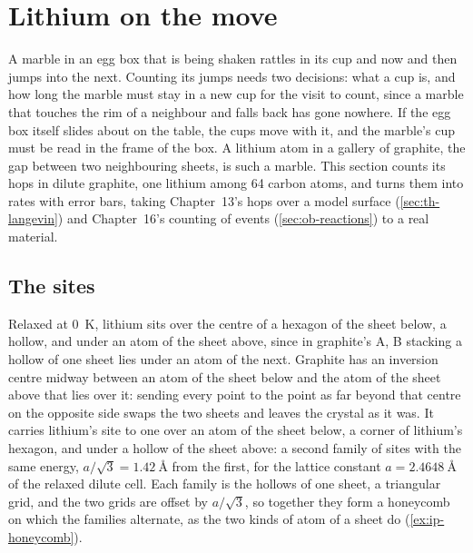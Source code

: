 \section{Lithium on the move}
\label{sec:ip-hops}

A marble in an egg box that is being shaken rattles in its cup and now
and then jumps into the next. Counting its jumps needs two decisions:
what a cup is, and how long the marble must stay in a new cup for the
visit to count, since a marble that touches the rim of a neighbour and
falls back has gone nowhere. If the egg box itself slides about on the
table, the cups move with it, and the marble's cup must be read in the
frame of the box. A lithium atom in a gallery of graphite, the gap
between two neighbouring sheets, is such a marble. This section counts its hops in dilute graphite, one lithium
among 64 carbon atoms, and turns them into rates with error bars, taking
Chapter~13's hops over a model surface (\cref{sec:th-langevin}) and
Chapter~16's counting of events (\cref{sec:ob-reactions}) to a real
material.

\subsection*{The sites}

Relaxed at \SI{0}{\kelvin}, lithium sits over the centre of a hexagon of
the sheet below, a hollow, and under an atom of the sheet above, since in
graphite's A, B stacking a hollow of one sheet lies under an atom of the
next. Graphite has an inversion centre midway between an atom of the
sheet below and the atom of the sheet above that lies over it: sending
every point to the point as far beyond that centre on the opposite side
swaps the two sheets and leaves the crystal as it was. It carries
lithium's site to one over an atom of the sheet below, a corner of
lithium's hexagon, and under a hollow of the sheet above: a second family
of sites with the same energy, $a/\sqrt3 = \SI{1.42}{\angstrom}$ from the
first, for the lattice constant $a = \SI{2.4648}{\angstrom}$ of the
relaxed dilute cell. Each family is the hollows of one sheet, a
triangular grid, and the two grids are offset by $a/\sqrt3$, so together
they form a honeycomb on which the families alternate, as the two kinds
of atom of a sheet do (\cref{ex:ip-honeycomb}).

